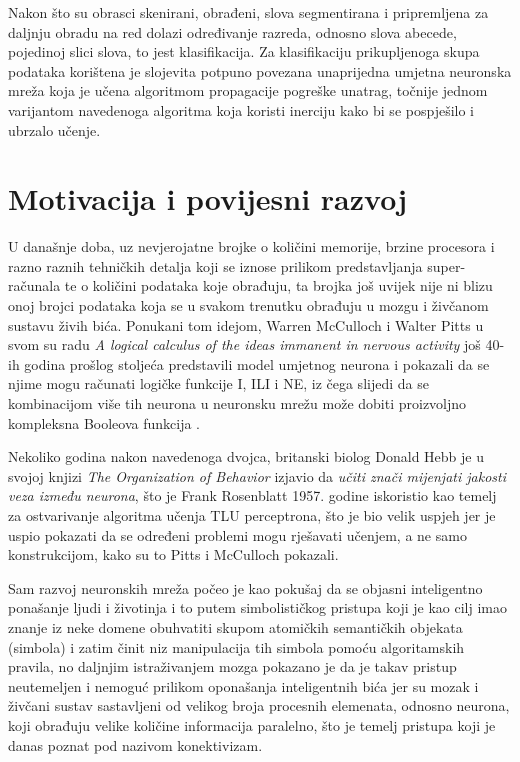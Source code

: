 Nakon što su obrasci skenirani, obrađeni, slova segmentirana i pripremljena za daljnju obradu na red dolazi određivanje razreda, odnosno slova abecede, pojedinoj slici slova, to jest klasifikacija. Za klasifikaciju prikupljenoga skupa podataka korištena je slojevita potpuno povezana unaprijedna umjetna neuronska mreža koja je učena algoritmom propagacije pogreške unatrag, točnije jednom varijantom navedenoga algoritma koja koristi inerciju kako bi se pospješilo i ubrzalo učenje.

\section{Motivacija i povijesni razvoj}

U današnje doba, uz nevjerojatne brojke o količini memorije, brzine procesora i razno raznih tehničkih detalja koji se iznose prilikom predstavljanja super-računala te o količini podataka koje obrađuju, ta brojka još uvijek nije ni blizu onoj brojci podataka koja se u svakom trenutku obrađuju u mozgu i živčanom sustavu živih bića. Ponukani tom idejom, Warren McCulloch i Walter Pitts u svom su radu \emph{A logical calculus of the ideas immanent in nervous activity} još 40-ih godina prošlog stoljeća predstavili model umjetnog neurona  i pokazali da se njime mogu računati logičke funkcije I, ILI i NE, iz čega slijedi da se kombinacijom više tih neurona u neuronsku mrežu može dobiti proizvoljno kompleksna Booleova funkcija \citep{nenr}.

Nekoliko godina nakon navedenoga dvojca, britanski biolog Donald Hebb je u svojoj knjizi \emph{The Organization of Behavior} izjavio da \emph{učiti znači mijenjati jakosti veza između neurona}, što je Frank Rosenblatt 1957. godine iskoristio kao temelj za ostvarivanje algoritma učenja TLU perceptrona, što je bio velik uspjeh jer je uspio pokazati da se određeni problemi mogu rješavati učenjem, a ne samo konstrukcijom, kako su to Pitts i McCulloch pokazali.

Sam razvoj neuronskih mreža počeo je kao pokušaj da se objasni inteligentno ponašanje ljudi i životinja i to putem simbolističkog pristupa koji je kao cilj imao znanje iz neke domene obuhvatiti skupom atomičkih semantičkih objekata (simbola) i zatim činit niz manipulacija tih simbola pomoću algoritamskih pravila, no daljnjim istraživanjem mozga pokazano je da je takav pristup neutemeljen i nemoguć prilikom oponašanja inteligentnih bića jer su mozak i živčani sustav sastavljeni od velikog broja procesnih elemenata, odnosno neurona, koji obrađuju velike količine informacija paralelno, što je temelj pristupa koji je danas poznat pod nazivom konektivizam.

